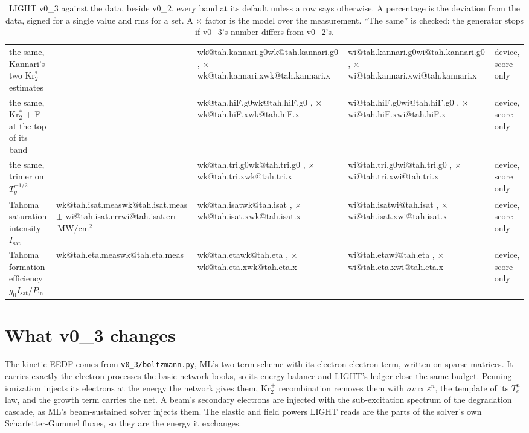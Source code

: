 \documentclass[11pt]{article}
\makeatletter
\newcommand\wi[1]{\ifcsname wi@#1\endcsname\csname wi@#1\endcsname
  \else\errmessage{no v0_2 number '#1'. Rerun make_overview_v0_2.py}\fi}
\newcommand\wk[1]{\ifcsname wk@#1\endcsname\csname wk@#1\endcsname
  \else\errmessage{no v0_3 number '#1'. Rerun make_overview_v0_3.py}\fi}
\newcommand{\unit}[1]{\ensuremath{\,\mathrm{#1}}}
\newcommand{\Krtp}{Kr\ensuremath{_2^+}}
\newcommand{\Krts}{Kr\ensuremath{_2^*}}
\newcommand{\gIP}{\ensuremath{g_0I_\mathrm{sat}/P_\mathrm{in}}}
\newcommand{\x}[1]{\ensuremath{\times}#1}
\makeatother
\begin{document}
\begin{table}[h]
\begin{tabularx}{\linewidth}{@{}>{\raggedright\arraybackslash}X
  >{\raggedright\arraybackslash}p{2.3cm}>{\raggedright\arraybackslash}p{2.3cm}
  >{\raggedright\arraybackslash}p{2.3cm}>{\raggedright\arraybackslash}p{1.9cm}@{}}
\quad the same, Kannari's two \Krts{} estimates & & \wk{tah.kannari.g0},
  \x{\wk{tah.kannari.x}} & \wi{tah.kannari.g0}, \x{\wi{tah.kannari.x}} &
  device, score only\\
\quad the same, \Krts{} + F at the top of its band & & \wk{tah.hiF.g0},
  \x{\wk{tah.hiF.x}} & \wi{tah.hiF.g0}, \x{\wi{tah.hiF.x}} & device,
  score only\\
\quad the same, trimer on $T_g^{-1/2}$ & & \wk{tah.tri.g0},
  \x{\wk{tah.tri.x}} & \wi{tah.tri.g0}, \x{\wi{tah.tri.x}} & device,
  score only\\
Tahoma saturation intensity $I_\mathrm{sat}$ & \wk{tah.isat.meas} $\pm$
  \wi{tah.isat.err}\unit{MW/cm^2} & \wk{tah.isat}, \x{\wk{tah.isat.x}} &
  \wi{tah.isat}, \x{\wi{tah.isat.x}} & device, score only\\
Tahoma formation efficiency \gIP & \wk{tah.eta.meas} & \wk{tah.eta},
  \x{\wk{tah.eta.x}} & \wi{tah.eta}, \x{\wi{tah.eta.x}} & device, score
  only\\
\bottomrule
\end{tabularx}
\caption{LIGHT v0\_3 against the data, beside v0\_2, every band at its
default unless a row says otherwise. A percentage is the deviation from
the data, signed for a single value and rms for a set. A \x{} factor is
the model over the measurement. ``The same'' is checked: the generator
stops if v0\_3's number differs from v0\_2's.}
\label{tab:score}
\end{table}

\section{What v0\_3 changes}

The kinetic EEDF comes from \texttt{v0\_3/boltzmann.py}, ML's two-term
scheme with its electron-electron term, written on sparse matrices. It
carries exactly the electron processes the basic network books, so its
energy balance and LIGHT's ledger close the same budget. Penning
ionization injects its electrons at the energy the network gives them,
\Krtp{} recombination removes them with $\sigma v \propto \varepsilon^n$,
the template of its $T_e^n$ law, and the growth term carries the net. A
beam's secondary electrons are injected with the sub-excitation spectrum
of the degradation cascade, as ML's beam-sustained solver injects them.
The elastic and field powers LIGHT reads are the parts of the solver's own
Scharfetter-Gummel fluxes, so they are the energy it exchanges.
\end{document}
